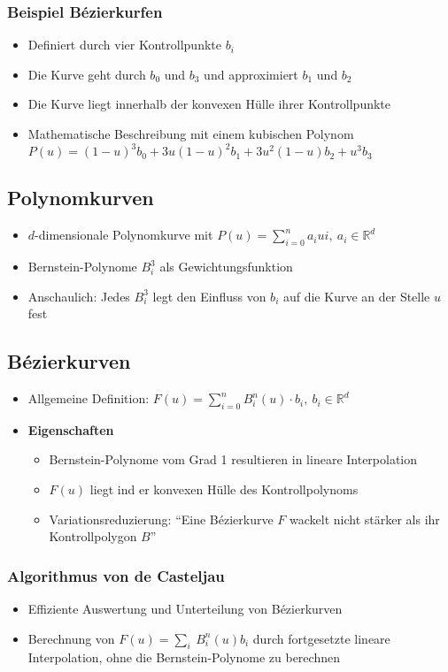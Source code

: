 \subsubsection{Beispiel Bézierkurfen}
\begin{itemize}
	\item Definiert durch vier Kontrollpunkte \(b_i\)
	\item Die Kurve geht durch \(b_0\) und \(b_3\) und approximiert \(b_1\) und \(b_2\)
	\item Die Kurve liegt innerhalb der konvexen Hülle ihrer Kontrollpunkte
	\item Mathematische Beschreibung mit einem kubischen Polynom \(P(u) = (1-u)^3b_0 + 3u(1-u)^2b_1 + 3u^2(1-u)b_2 + u^3b_3\)
\end{itemize}


\subsection{Polynomkurven}
\begin{itemize}
	\item \(d\)-dimensionale Polynomkurve mit \(P(u) = \sum_{i=0}^n a_iui,~a_i \in \mathbb{R}^d\)
	\item Bernstein-Polynome \(B_i^3\) als Gewichtungsfunktion
	\item Anschaulich: Jedes \(B_i^3\) legt den Einfluss von \(b_i\) auf die Kurve an der Stelle \(u\) fest
\end{itemize}


\subsection{Bézierkurven}
\begin{itemize}
	\item Allgemeine Definition: \(F(u) = \sum_{i=0}^n B_i^n(u) \cdot b_i,~b_i \in \mathbb{R}^d\)
	\item \textbf{Eigenschaften}
	\begin{itemize}
		\item Bernstein-Polynome vom Grad 1 resultieren in lineare Interpolation
		\item \(F(u)\) liegt ind er konvexen Hülle des Kontrollpolynoms
		\item Variationsreduzierung: "`Eine Bézierkurve \(F\) wackelt nicht stärker als ihr Kontrollpolygon \(B\)"'
	\end{itemize}
\end{itemize}

\subsubsection{Algorithmus von de Casteljau}
\begin{itemize}
	\item Effiziente Auswertung und Unterteilung von Bézierkurven
	\item Berechnung von \(F(u) = \sum_i\ B_i^n(u)b_i\) durch fortgesetzte lineare Interpolation, ohne die Bernstein-Polynome zu berechnen
\end{itemize}


